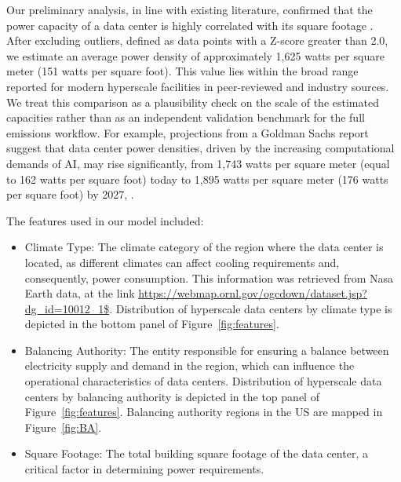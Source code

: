 \documentclass[12pt]{article}
\begin{document}
Our preliminary analysis, in line with existing literature, confirmed that the power capacity of a data center is highly correlated with its square footage \cite{istrate2024environmental, dante2024,sarkar2024carbon,masanet2020recalibrating,Shehabi2016DataCenter,luers2024will,siddik2021environmental,masanet2020much}. After excluding outliers, defined as data points with a Z-score greater than 2.0, we estimate an average power density of approximately 1,625 watts per square meter (151 watts per square foot). 
This value lies within the broad range reported for modern hyperscale facilities in peer-reviewed and industry sources. We treat this comparison as a plausibility check on the scale of the estimated capacities rather than as an independent validation benchmark for the full emissions workflow. For example, projections from a Goldman Sachs report suggest that data center power densities, driven by the increasing computational demands of AI, may rise significantly, from 1,743 watts per square meter (equal to 162 watts per square foot) today to 1,895 watts per square meter (176 watts per square foot) by 2027, \cite{goldman2023ai}.

The features used in our model included:
\begin{itemize}

\item Climate Type: The climate category of the region where the data center is located, as different climates can affect cooling requirements and, consequently, power consumption. This information was retrieved from Nasa Earth data, at the link \url{https://webmap.ornl.gov/ogcdown/dataset.jsp?dg_id=10012_1$}. Distribution of hyperscale data centers by climate type is depicted in the bottom panel of Figure~\ref{fig:features}.

\item Balancing Authority: The entity responsible for ensuring a balance between electricity supply and demand in the region, which can influence the operational characteristics of data centers. Distribution of hyperscale data centers by balancing authority is depicted in the top panel of Figure~\ref{fig:features}. Balancing authority regions in the US are mapped in Figure~\ref{fig:BA}.



\item Square Footage: The total building square footage of the data center, a critical factor in determining power requirements.

\end{itemize}
\end{document}
